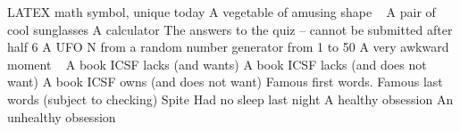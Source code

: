 \begin{multicols}{2}
\begin{small}
\begin{tabbing}
      
          {LATEX math symbol, unique today}
            {A vegetable of amusing shape ~\FD}
        {A pair of cool sunglasses}
        {A calculator}
           {The answers to the quiz – cannot be submitted after half 6}
        {A UFO}
        {N from a random number generator from 1 to 50}
            {A very awkward moment ~\FD}
          {A book ICSF lacks (and wants)}
          {A book ICSF lacks (and does not want)}
           {A book ICSF owns (and does not want)}
           {Famous first words.}
          {Famous last words (subject to checking)}
          {Spite}
       {Had no sleep last night}
           {A healthy obsession}
           {An unhealthy obsession}

\end{tabbing}
\end{small}
\end{multicols}
